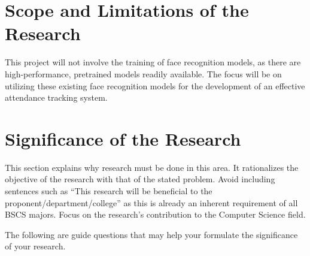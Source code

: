 \section{Scope and Limitations of the Research}
\label{sec:scopelimitations}

This project will not involve the training of face recognition models, as there are high-performance, pretrained models readily available. The focus will be on utilizing these existing face recognition models for the development of an effective attendance tracking system.

\begin{comment}
	This section discusses the boundaries (with respect to the objectives) of the research and the constraints within 
	which the research will be developed.
\end{comment}

\begin{comment}

%
%
Generally, one paragraph should be allotted for each of your research objectives.

Each paragraph contains a brief overview of the concept/theory and the purpose of doing the associated objective.

Each paragraph also includes a description of the scope/limitation of your study.

* Please refer to the slides for examples.

\end{comment}


\section{Significance of the Research}
\label{sec:significance}

This section explains why research must be done in this area.
 It rationalizes the objective of the research with that of the stated problem. 
 Avoid including sentences such as ``This research will be beneficial to the proponent/department/college'' as this is already an inherent requirement of all BSCS majors.  Focus on the research's contribution to the Computer Science field.

The following are guide questions that may help your formulate the significance of your research. 


